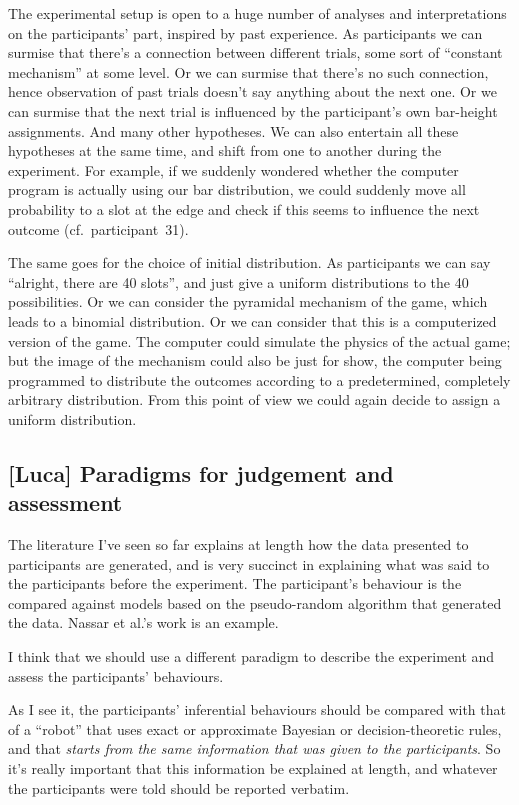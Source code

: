 \documentclass[\ifafour a4paper,12pt,\else a5paper,10pt,\fi%
onecolumn,oneside,article,%
british%
]{memoir}
\newcommand*{\etal}{{et al.}}
\theoremstyle{remark}
\theoremstyle{innote}
\newcommand*{\citey}{\parencites*}
\renewcommand*{\|}{\mathpunct{|}}
\newcommand*{\cf}{{cf.}}
\begin{document}
The experimental setup is open to a huge number of analyses and
interpretations on the participants' part, inspired by past experience. As
participants we can surmise that there's a connection between different
trials, some sort of \enquote{constant mechanism} at some level. Or we can
surmise that there's no such connection, hence observation of past trials
doesn't say anything about the next one. Or we can surmise that the next
trial is influenced by the participant's own bar-height assignments. And
many other hypotheses. We can also entertain all these hypotheses at the
same time, and shift from one to another during the experiment. For
example, if we suddenly wondered whether the computer program is actually
using our bar distribution, we could suddenly move all probability to a
slot at the edge and check if this seems to influence the next outcome
(\cf\ participant~31).

The same goes for the choice of initial distribution. As
participants we can say \enquote{alright, there are 40 slots}, and just
give a uniform distributions to the 40 possibilities. Or we can consider
the pyramidal mechanism of the game, which leads to a binomial
distribution. Or we can consider that this is a computerized version of the
game. The computer could simulate the physics of the actual game; but the
image of the mechanism could also be just for show, the computer being
programmed to distribute the outcomes according to a predetermined,
completely arbitrary distribution. From this point of view we could again
decide to assign a uniform distribution.

\subsection{[Luca] Paradigms for judgement and assessment}

The literature I've seen so far explains at length how the data presented
to participants are generated, and is very succinct in explaining what was
said to the participants before the experiment. The participant's behaviour
is the compared against models based on the pseudo-random algorithm that
generated the data. Nassar \etal's \citey{nassaretal2010} work is an
example.

I think that we should use a different paradigm to describe the experiment
and assess the participants' behaviours.

As I see it, the participants' inferential behaviours should be compared
with that of a \enquote{robot} that uses exact or approximate Bayesian or
decision-theoretic rules, and that \emph{starts from the same information
  that was given to the participants}. So it's really important that this
information be explained at length, and whatever the participants were told
should be reported verbatim.
\end{document}
